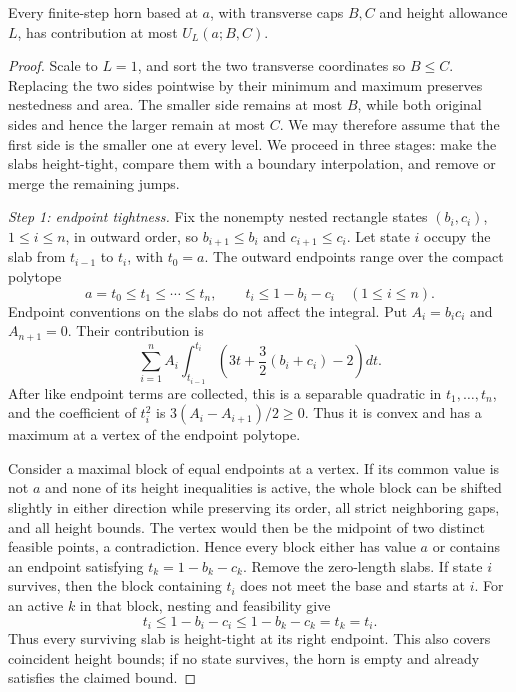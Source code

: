 \begin{lemma}\label{lemma:c:4.1}

Every finite-step horn based at \(a\), with transverse caps \(B,C\) and
height allowance \(L\), has contribution at most \(U_L(a;B,C)\).

\end{lemma}
\begin{proof}

Scale to \(L=1\), and sort the two transverse coordinates so \(B\le C\).
Replacing the two sides pointwise by their minimum and maximum preserves
nestedness and area. The smaller side remains at most \(B\), while both
original sides and hence the larger remain at most \(C\). We may therefore
assume that the first side is the smaller one at every level.
We proceed in three stages: make the slabs height-tight, compare them
with a boundary interpolation, and remove or merge the remaining jumps.

\smallskip\noindent\emph{Step 1: endpoint tightness.}
Fix the nonempty nested rectangle states \((b_i,c_i)\), \(1\le i\le n\),
in outward order, so \(b_{i+1}\le b_i\) and \(c_{i+1}\le c_i\).
Let state \(i\) occupy the slab from \(t_{i-1}\) to \(t_i\), with
\(t_0=a\). The outward endpoints range over the compact polytope
\[
a=t_0\le t_1\le\cdots\le t_n,
\qquad t_i\le1-b_i-c_i\quad(1\le i\le n).
\]
Endpoint conventions on the slabs do not affect the integral. Put
\(A_i=b_ic_i\) and \(A_{n+1}=0\). Their contribution is
\[
\sum_{i=1}^n A_i
 \int_{t_{i-1}}^{t_i}
 \left(3t+\frac32(b_i+c_i)-2\right)dt.
\]
After like endpoint terms are collected, this is a separable quadratic in
\(t_1,\ldots,t_n\), and the coefficient of \(t_i^2\) is
\(3(A_i-A_{i+1})/2\ge0\). Thus it is convex and has a maximum at a vertex of
the endpoint polytope.

Consider a maximal block of equal endpoints at a vertex. If its common
value is not \(a\) and none of its height inequalities is active, the whole
block can be shifted slightly in either direction while preserving its
order, all strict neighboring gaps, and all height bounds. The vertex would
then be the midpoint of two distinct feasible points, a contradiction.
Hence every block either has value \(a\) or contains an endpoint satisfying
\(t_k=1-b_k-c_k\). Remove the zero-length slabs. If state \(i\) survives,
then the block containing \(t_i\) does not meet the base and starts at \(i\).
For an active \(k\) in that block, nesting and feasibility give
\[
t_i\le1-b_i-c_i\le1-b_k-c_k=t_k=t_i.
\]
Thus every surviving slab is height-tight at its right endpoint. This also
covers coincident height bounds; if no state survives, the horn is empty and
already satisfies the claimed bound.


\end{proof}
